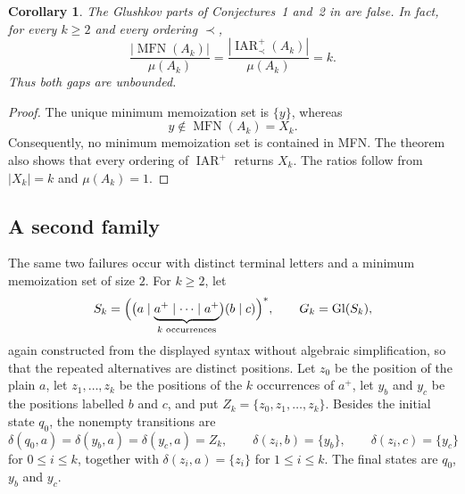 \documentclass[11pt]{amsart}
\newtheorem{corollary}[theorem]{Corollary}
\newcommand{\Gl}{\operatorname{Gl}}
\newcommand{\MFN}{\operatorname{MFN}}
\newcommand{\IARp}{\operatorname{IAR}^{+}}
\begin{document}
\begin{corollary}
The Glushkov parts of Conjectures~1 and~2 in
\cite{BerglundEtAl2026} are false. In fact, for every $k\ge 2$ and
every ordering $\prec$,
\[
\frac{|\MFN(A_k)|}{\mu(A_k)}
=
\frac{|\IARp_{\prec}(A_k)|}{\mu(A_k)}
=
k.
\]
Thus both gaps are unbounded.
\end{corollary}

\begin{proof}
The unique minimum memoization set is $\{y\}$, whereas
\[
y\notin\MFN(A_k)=X_k.
\]
Consequently, no minimum memoization set is contained in MFN. The
theorem also shows that every ordering of $\IARp$ returns $X_k$. The
ratios follow from $|X_k|=k$ and $\mu(A_k)=1$.
\end{proof}

\subsection{A second family}

The same two failures occur with distinct terminal letters and a
minimum memoization set of size $2$. For $k\ge 2$, let
\[
S_k=
\Bigl(
  \bigl(
    a\mid\underbrace{a^+\mid\cdots\mid a^+}_{k\text{ occurrences}}
  \bigr)(b\mid c)
\Bigr)^*,
\qquad
G_k=\Gl(S_k),
\]
again constructed from the displayed syntax without algebraic
simplification, so that the repeated alternatives are distinct
positions. Let $z_0$ be the position of the plain $a$, let
$z_1,\ldots,z_k$ be the positions of the $k$ occurrences of $a^+$, let
$y_b$ and $y_c$ be the positions labelled $b$ and $c$, and put
$Z_k=\{z_0,z_1,\ldots,z_k\}$. Besides the initial state $q_0$, the
nonempty transitions are
\[
\delta(q_0,a)=\delta(y_b,a)=\delta(y_c,a)=Z_k,
\qquad
\delta(z_i,b)=\{y_b\},
\qquad
\delta(z_i,c)=\{y_c\}
\]
for $0\le i\le k$, together with $\delta(z_i,a)=\{z_i\}$ for
$1\le i\le k$. The final states are $q_0$, $y_b$ and $y_c$.
\end{document}
